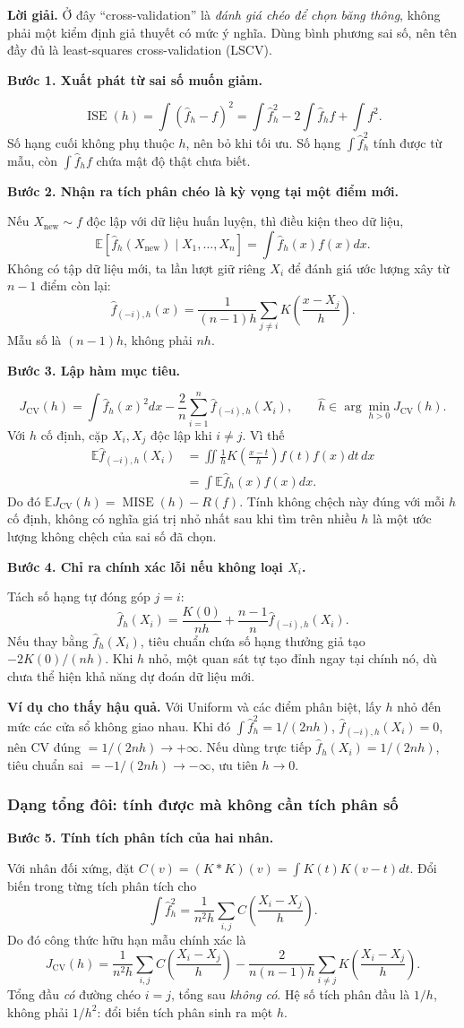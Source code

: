 \documentclass[11pt,a4paper]{article}
\DeclareMathOperator{\MISE}{MISE}
\DeclareMathOperator{\ISE}{ISE}
\newcommand{\E}{\mathbb E}
\newcommand{\fh}{\widehat f_h}
\newcommand{\buoc}[1]{\par\medskip\textbf{#1}\par}
\begin{document}
\textbf{Lời giải.}
Ở đây ``cross-validation'' là \emph{đánh giá chéo để chọn băng thông}, không phải một kiểm định giả thuyết có mức ý nghĩa. Dùng bình phương sai số, nên tên đầy đủ là least-squares cross-validation (LSCV).

\buoc{Bước 1. Xuất phát từ sai số muốn giảm.}
\[
\ISE(h)=\int(\fh-f)^2
=\int\fh^2-2\int\fh f+\int f^2.
\]
Số hạng cuối không phụ thuộc $h$, nên bỏ khi tối ưu. Số hạng $\int\fh^2$ tính được từ mẫu, còn $\int\fh f$ chứa mật độ thật chưa biết.

\buoc{Bước 2. Nhận ra tích phân chéo là kỳ vọng tại một điểm mới.}
Nếu $X_{\mathrm{new}}\sim f$ độc lập với dữ liệu huấn luyện, thì điều kiện theo dữ liệu,
\[
\E[\fh(X_{\mathrm{new}})\mid X_1,\ldots,X_n]=\int\fh(x)f(x)dx.
\]
Không có tập dữ liệu mới, ta lần lượt giữ riêng $X_i$ để đánh giá ước lượng xây từ $n-1$ điểm còn lại:
\[
\widehat f_{(-i),h}(x)=\frac1{(n-1)h}\sum_{j\ne i}K\!\left(\frac{x-X_j}{h}\right).
\]
Mẫu số là $(n-1)h$, không phải $nh$.

\buoc{Bước 3. Lập hàm mục tiêu.}
\[
\boxed{J_{\mathrm{CV}}(h)=\int\fh(x)^2dx-\frac2n\sum_{i=1}^n\widehat f_{(-i),h}(X_i),
\qquad\widehat h\in\arg\min_{h>0}J_{\mathrm{CV}}(h).}
\]
Với $h$ cố định, cặp $X_i,X_j$ độc lập khi $i\ne j$. Vì thế
\begin{align*}
\E\widehat f_{(-i),h}(X_i)
&=\iint\frac1hK\!\left(\frac{x-t}{h}\right)f(t)f(x)dt\,dx\\
&=\int\E\fh(x)f(x)dx.
\end{align*}
Do đó $\E J_{\mathrm{CV}}(h)=\MISE(h)-R(f)$. Tính không chệch này đúng với mỗi $h$ cố định, không có nghĩa giá trị nhỏ nhất sau khi tìm trên nhiều $h$ là một ước lượng không chệch của sai số đã chọn.

\buoc{Bước 4. Chỉ ra chính xác lỗi nếu không loại $X_i$.}
Tách số hạng tự đóng góp $j=i$:
\[
\fh(X_i)=\frac{K(0)}{nh}+\frac{n-1}{n}\widehat f_{(-i),h}(X_i).
\]
Nếu thay bằng $\fh(X_i)$, tiêu chuẩn chứa số hạng thưởng giả tạo $-2K(0)/(nh)$. Khi $h$ nhỏ, một quan sát tự tạo đỉnh ngay tại chính nó, dù chưa thể hiện khả năng dự đoán dữ liệu mới.

\textbf{Ví dụ cho thấy hậu quả.} Với Uniform và các điểm phân biệt, lấy $h$ nhỏ đến mức các cửa sổ không giao nhau. Khi đó $\int\fh^2=1/(2nh)$, $\widehat f_{(-i),h}(X_i)=0$, nên CV đúng $=1/(2nh)\to+\infty$. Nếu dùng trực tiếp $\fh(X_i)=1/(2nh)$, tiêu chuẩn sai $=-1/(2nh)\to-\infty$, ưu tiên $h\to0$.

\subsubsection*{Dạng tổng đôi: tính được mà không cần tích phân số}
\buoc{Bước 5. Tính tích phân tích của hai nhân.}
Với nhân đối xứng, đặt $C(v)=(K*K)(v)=\int K(t)K(v-t)dt$. Đổi biến trong từng tích phân tích cho
\[
\int\fh^2=\frac1{n^2h}\sum_{i,j}C\!\left(\frac{X_i-X_j}{h}\right).
\]
Do đó công thức hữu hạn mẫu chính xác là
\[
\boxed{J_{\mathrm{CV}}(h)=\frac1{n^2h}\sum_{i,j}C\!\left(\frac{X_i-X_j}{h}\right)
-\frac2{n(n-1)h}\sum_{i\ne j}K\!\left(\frac{X_i-X_j}{h}\right).}
\]
Tổng đầu \emph{có} đường chéo $i=j$, tổng sau \emph{không có}. Hệ số tích phân đầu là $1/h$, không phải $1/h^2$: đổi biến tích phân sinh ra một $h$.
\end{document}
